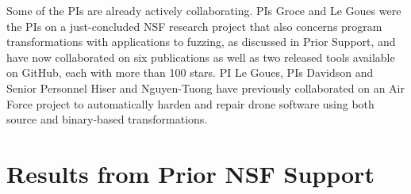 Some of the PIs are already actively collaborating.
PIs Groce and Le Goues were the PIs on a just-concluded NSF research project
that also concerns program transformations with applications to
fuzzing, as discussed in Prior Support, and have now collaborated on
six publications as well as two released tools available on GitHub,
each with more than 100 stars. 
PI Le Goues, PIs Davidson and Senior Personnel Hiser and Nguyen-Tuong
have previously collaborated on an Air Force project to automatically harden
and repair drone software using both source and binary-based transformations.  

\section{Results from Prior NSF Support}


